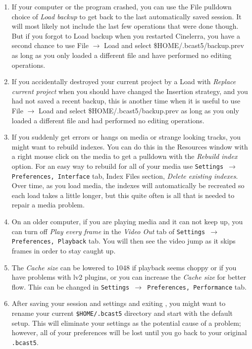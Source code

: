 \begin{enumerate}
        \item If your computer or the program crashed, you can use the File pulldown choice
of \textit{Load backup} to get back to the last automatically saved session. It will most
likely not include the last few operations that were done though.  But if you forgot to 
Load backup when you restarted Cinelerra, you have a second chance to use File $\rightarrow$ Load and
select \$HOME/.bcast5/backup.prev as long as you only loaded a different file and have
performed no editing operations.
         \item If you accidentally destroyed your current project by a Load with 
\textit{Replace current project} when you should have changed the Insertion strategy, and 
you had not saved a recent backup, this is another time when it is useful to use
File $\rightarrow$ Load and select \$HOME/.bcast5/backup.prev as long as you only loaded a different
file and had performed no editing operations.
	\item If you suddenly get errors or hangs on media or strange looking tracks, you might want to rebuild indexes. You can do this in the Resources window with a right mouse click on the media to get a pulldown with the \textit{Rebuild index} option. For an easy way to rebuild for all of your media use \texttt{Settings $\rightarrow$ Preferences, Interface} tab, Index Files section, \textit{Delete existing indexes}. Over time, as you
load media, the indexes will automatically be recreated so each load takes a little longer, but this quite often
is all that is needed to repair a media problem.
	\item On an older computer, if you are playing media and it can not keep up, you can turn off \textit{Play every frame} in the \textit{Video Out} tab of \texttt{Settings $\rightarrow$ Preferences, Playback} tab. You will then see the video jump as it skips frames in order to stay caught up.
	\item The \textit{Cache size} can be lowered to 1048 if playback seems choppy or if you have problems with lv2 plugins, or you can increase the \textit{Cache size} for better flow. This can be changed in \texttt{Settings $\rightarrow$ Preferences, Performance} tab.
	\item After saving your session and settings and exiting \CGG{}, you might want to rename your current \texttt{\$HOME/.bcast5} directory and start with the default setup. This will eliminate your settings as the potential cause of a problem; however, all of your preferences will be lost until you go back to your original \texttt{.bcast5}.

\end{enumerate}
